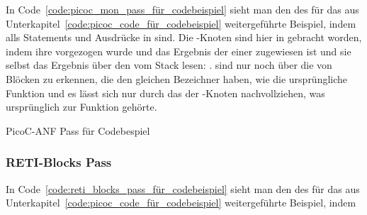 
In Code~\ref{code:picoc_mon_pass_für_codebeispiel} sieht man den  des  für das aus Unterkapitel~\ref{code:picoc_code_für_codebeispiel} weitergeführte Beispiel, indem alls Statements und Ausdrücke in  sind. Die -Knoten sind hier in   gebracht worden, indem ihre  vorgezogen wurde und das Ergebnis der  einer  zugewiesen ist und sie selbst das Ergebnis über den   vom Stack lesen: .  sind nur noch über die  von Blöcken zu erkennen, die den gleichen Bezeichner haben, wie die ursprüngliche Funktion und es lässt sich nur durch das  der -Knoten nachvollziehen, was ursprünglich zur Funktion gehörte.

\begin{code}
  \centering
  \caption{PicoC-ANF Pass für Codebespiel}
  \label{code:picoc_mon_pass_für_codebeispiel}
\end{code}

\subsubsection{RETI-Blocks Pass}
\label{reti_blocks_pass}

\label{sec:reti_blocks_pass_zweck}

\begin{grammar}
  \toprule
  \retiblocks
  \midrule
  \picocblocksleftover
  \bottomrule
\end{grammar}

\begin{Special_Paragraph}

\end{Special_Paragraph}


In Code~\ref{code:reti_blocks_pass_für_codebeispiel} sieht man den  des  für das aus Unterkapitel~\ref{code:picoc_code_für_codebeispiel} weitergeführte Beispiel, indem

